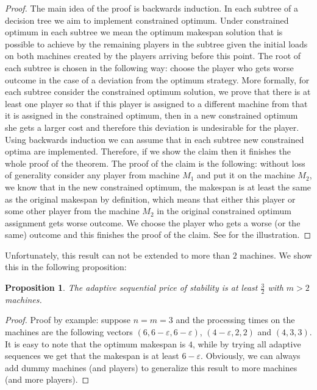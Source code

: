 \documentclass[12pt,a4paper]{article}
\newtheorem{proposition}[lemma]{Proposition}
\theoremstyle{definition}
\theoremstyle{remark}
\renewcommand{\epsilon}{\varepsilon}
\begin{document}
\begin{proof}
The main idea of the proof is backwards induction. In each subtree of a decision tree we aim to implement constrained optimum. Under constrained optimum in each subtree we mean the optimum makespan solution that is possible to achieve by the remaining players in the subtree given the initial loads on both machines created by the players arriving before this point. The root of each subtree is chosen in the following way: choose the player who gets worse outcome in the case of a deviation from the optimum strategy. More formally, for each subtree  consider the constrained optimum solution, we prove that there is at least one player so that if this player is assigned to a different machine from that it is assigned in the constrained optimum, then in a new constrained optimum she gets a larger cost and therefore this deviation is undesirable for the player.  Using backwards induction we can assume that in each subtree new constrained optima are implemented. Therefore, if we show the claim then it finishes the whole proof of the theorem. The proof of the claim is the following: without loss of generality consider any player from machine $M_1$ and put it on the machine $M_2$, we know that in the new constrained optimum, the makespan is at least the same as the original makespan by definition, which means that either this player or some other player from the machine $M_2$ in the original constrained optimum assignment gets worse outcome. We choose the player who gets a worse (or the same) outcome and this finishes the proof of the claim. See  for the illustration. 
\end{proof}

Unfortunately, this result can not be extended to more than $2$ machines. We show this in the following proposition:

\begin{proposition}
The adaptive sequential price of stability is at least $\frac{3}{2}$ with $m>2$ machines. 
\end{proposition}

\begin{proof}
Proof by example: suppose $n=m=3$ and the processing times on the machines are the following vectors $(6,6-\epsilon,6-\epsilon)$, $(4-\epsilon, 2,2)$ and $(4, 3,3)$. It is easy to note that the optimum makespan is $4$, while by trying all adaptive sequences we get that the makespan is at least $6-\epsilon$. Obviously, we can always add dummy machines (and players) to generalize this result to more machines (and more players). 
\end{proof}
\end{document}
